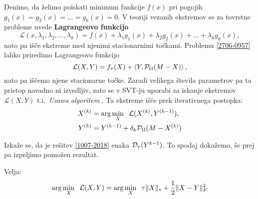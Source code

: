 Denimo, da želimo poiskati minimum funkcije $f(x)$ pri pogojih $g_1(x)=g_2(x)=\ldots=g_{k}(x)=0$.
V teoriji vezanih ekstremov se za tovrstne probleme uvede \textbf{Lagrangeovo funkcijo}
\[\mathcal{L}(x, \lambda_1,\lambda_2,\ldots,\lambda_k) = f(x) + \lambda_1 g_1(x)+\lambda_2g_2(x)+\ldots+\lambda_kg_k(x),\]
nato pa išče ekstreme med njenimi stacionarnimi točkami.
Problemu \eqref{2706-0957} lahko priredimo Lagrangeovo funkcijo
\[
    \mathcal{L}(X, Y) = f_\tau(X) + \left< Y, \mathcal{P}_\Omega(M - X) \right>,
\] 
nato pa iščemo njene stacionarne točke.
Zaradi velikega števila parametrov pa ta pristop navadno ni izvedljiv, zato se v SVT-ju uporabi za iskanje ekstremov $\mathcal{L}(X, Y)$ t.i.\ \textit{Uzawa algoritem} \cite{CCS}. Ta ekstreme išče prek iterativnega postopka:
\begin{align}
        X^{(k)} &=  \arg \min_{X} \hspace{0.2cm}\mathcal{L}(X^{(k)}, Y^{(k-1)}) \label{1007-2018},\\
        Y^{(k)} &= Y^{(k-1)} + \delta_k \mathcal{P}_\Omega(M - X^{(k)}) \label{1007-2019}
\end{align}


Izkaže se, da je rešitev \eqref{1007-2018} enaka $\mathcal{D}_\tau(Y^{k-1})$. To spodaj dokažemo, še prej pa izpeljimo pomožen rezultat.

\begin{trditev}
Velja:
\begin{align}
    \arg \min_X \hspace{0.2cm} \mathcal{L}(X, Y)
    = \arg \min_X \hspace{0.2cm} \tau\lVert X\rVert_* + \frac{1}{2}\lVert X - Y\rVert_F^2
\end{align}
\end{trditev}

